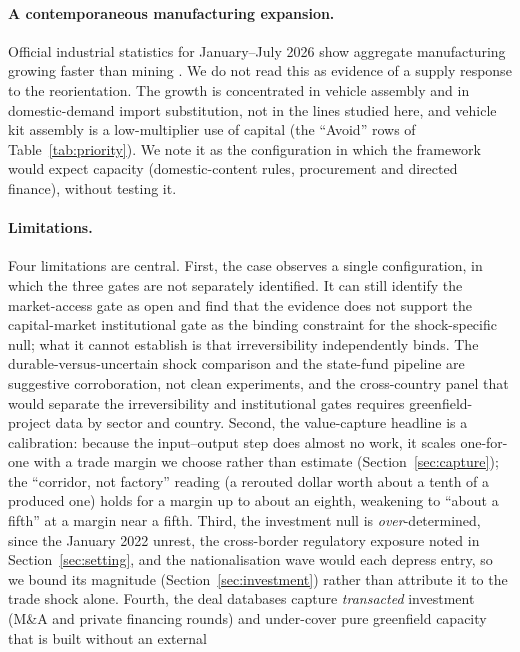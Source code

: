 \documentclass[12pt]{article}
\begin{document}
\paragraph{A contemporaneous manufacturing expansion.} Official industrial statistics for January--July 2026 show aggregate manufacturing growing faster than mining \citep{qazstat2026industry}. We do not read this as evidence of a supply response to the reorientation. The growth is concentrated in vehicle assembly and in domestic-demand import substitution, not in the lines studied here, and vehicle kit assembly is a low-multiplier use of capital (the ``Avoid'' rows of Table~\ref{tab:priority}). We note it as the configuration in which the framework would expect capacity (domestic-content rules, procurement and directed finance), without testing it.

\paragraph{Limitations.} Four limitations are central. First, the case observes a single
configuration, in which the three gates are not separately identified. It can still identify
the market-access gate as open and find that the evidence does not support the capital-market institutional gate as the binding constraint for the shock-specific null; what it cannot establish is that
irreversibility independently binds. The durable-versus-uncertain shock comparison and the
state-fund pipeline are suggestive corroboration, not clean experiments, and the cross-country
panel that would separate the irreversibility and institutional gates requires
greenfield-project data by sector and country. Second, the value-capture headline is a
calibration: because the input--output step does almost no work, it scales one-for-one with a
trade margin we choose rather than estimate (Section~\ref{sec:capture}); the
``corridor, not factory'' reading (a rerouted dollar worth about a tenth of a produced one)
holds for a margin up to about an eighth, weakening to ``about a fifth'' at a margin near a
fifth. Third, the investment null is
\emph{over}-determined, since the January 2022 unrest, the cross-border regulatory exposure noted in Section~\ref{sec:setting}, and the nationalisation wave would each depress entry, so
we bound its magnitude (Section~\ref{sec:investment}) rather than attribute it to the trade
shock alone. Fourth, the deal databases capture \emph{transacted} investment (M\&A and private
financing rounds) and under-cover pure greenfield capacity that is built without an external
\end{document}

